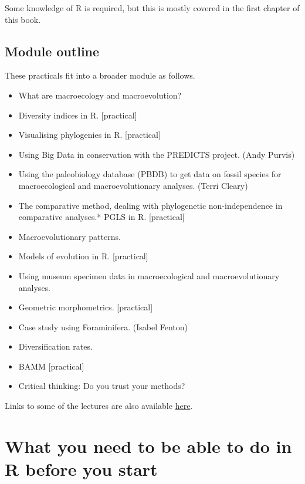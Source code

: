 \documentclass[]{book}
\providecommand{\tightlist}{%
  \setlength{\itemsep}{0pt}\setlength{\parskip}{0pt}}
\begin{document}
Some knowledge of R is required, but this is mostly covered in the first
chapter of this book.

\section{Module outline}\label{module-outline}

These practicals fit into a broader module as follows.

\begin{itemize}
\tightlist
\item
  What are macroecology and macroevolution?
\item
  Diversity indices in R. {[}practical{]}
\item
  Visualising phylogenies in R. {[}practical{]}
\item
  Using Big Data in conservation with the PREDICTS project. (Andy
  Purvis)
\item
  Using the paleobiology database (PBDB) to get data on fossil species
  for macroecological and macroevolutionary analyses. (Terri Cleary)
\item
  The comparative method, dealing with phylogenetic non-independence in
  comparative analyses.* PGLS in R. {[}practical{]}
\item
  Macroevolutionary patterns.
\item
  Models of evolution in R. {[}practical{]}
\item
  Using museum specimen data in macroecological and macroevolutionary
  analyses.
\item
  Geometric morphometrics. {[}practical{]}
\item
  Case study using Foraminifera. (Isabel Fenton)
\item
  Diversification rates.
\item
  BAMM {[}practical{]}
\item
  Critical thinking: Do you trust your methods?
\end{itemize}

Links to some of the lectures are also available
\href{https://github.com/nhcooper123/TeachingMaterials/blob/master/MSc_Museum/Lectures/Lectures_README.md}{here}.

\chapter{What you need to be able to do in R before you
start}\label{what-you-need-to-be-able-to-do-in-r-before-you-start}
\end{document}
